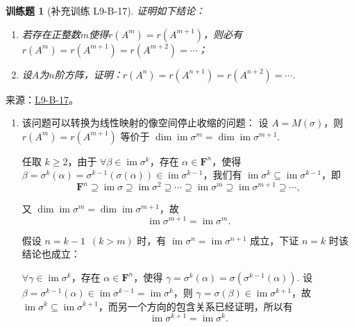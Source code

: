 \documentclass[UTF8,12pt,a4paper,fontset=fandol]{ctexart}
\newtheorem{exercise}{训练题}[section]
\begin{document}
\begin{exercise}[补充训练 L9-B-17]\label{prob:L9-B-17}
证明如下结论：
        \begin{enumerate}
            \item 若存在正整数$m$使得$r(A^m)=r(A^{m+1})$，则必有$r(A^m)=r(A^{m+1})=r(A^{m+2})=\cdots$；
            \item 设$A$为$n$阶方阵，证明：$r(A^n)=r(A^{n+1})=r(A^{n+2})=\cdots$.
        \end{enumerate}
\end{exercise}
\noindent 来源：\href{https://github.com/yhwu-is/Linear-Algebra-Left-Undone/blob/new/%E8%AE%B2%E4%B9%89/%E4%B8%93%E9%A2%98/9%20%E7%9F%A9%E9%98%B5%E8%BF%90%E7%AE%97%E8%BF%9B%E9%98%B6.tex}{L9-B-17}。
\begin{solve}
\begin{enumerate}
                \item 该问题可以转换为线性映射的像空间停止收缩的问题：
                    设 $A = M(\sigma)$，则 $r(A^m) = r(A^{m+1})$ 等价于 $\dim \operatorname{im} \sigma^m = \dim \operatorname{im} \sigma^{m+1}$.

                    任取 $k \geqslant 2$，由于 $\forall \beta \in \operatorname{im} \sigma^k$，存在 $\alpha \in \mathbf{F}^n$，使得 $\beta = \sigma^k(\alpha) = \sigma^{k-1}(\sigma(\alpha)) \in \operatorname{im} \sigma^{k-1}$，我们有 $\operatorname{im} \sigma^k \subseteq \operatorname{im} \sigma^{k-1}$，即
                    \[
                        \mathbf{F}^n \supseteq \operatorname{im} \sigma \supseteq \operatorname{im} \sigma^2 \supseteq \cdots \supseteq \operatorname{im} \sigma^m \supseteq \operatorname{im} \sigma^{m+1} \supseteq \cdots,
                    \]

                    又 $\dim \operatorname{im} \sigma^m = \dim \operatorname{im} \sigma^{m+1}$，故
                    \[
                        \operatorname{im} \sigma^{m+1} = \operatorname{im} \sigma^m.
                    \]

                    假设 $n=k-1 \enspace (k > m)$ 时，有 $\operatorname{im} \sigma^n = \operatorname{im} \sigma^{n+1}$ 成立，下证 $n=k$ 时该结论也成立：

                    $\forall \gamma \in \operatorname{im} \sigma^k$，存在 $\alpha \in \mathbf{F}^n$，使得 $\gamma = \sigma^k(\alpha) = \sigma(\sigma^{k-1}(\alpha))$. 设 $\beta = \sigma^{k-1}(\alpha) \in \operatorname{im} \sigma^{k-1} = \operatorname{im} \sigma^k$，则 $\gamma = \sigma(\beta) \in \operatorname{im} \sigma^{k+1}$，故 $\operatorname{im} \sigma^k \subseteq \operatorname{im} \sigma^{k+1}$，而另一个方向的包含关系已经证明，所以有
                    \[
                        \operatorname{im} \sigma^{k+1} = \operatorname{im} \sigma^k.
                    \]


\end{enumerate}
\end{solve}
\end{document}
